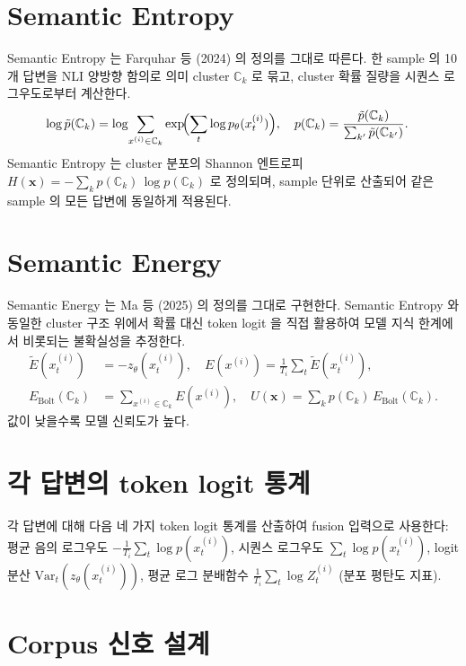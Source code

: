 \section{Semantic Entropy}\label{sec:se_def}

Semantic Entropy 는 Farquhar 등 (2024) 의 정의를 그대로 따른다. 한 sample 의 10개 답변을 NLI 양방향 함의로 의미 cluster $\mathbb{C}_k$ 로 묶고, cluster 확률 질량을 시퀀스 로그우도로부터 계산한다.
\begin{align*}
\log \tilde{p}(\mathbb{C}_k) &= \log\!\sum_{x^{(i)} \in \mathbb{C}_k} \exp\!\Bigl(\sum_t \log p_\theta(x_t^{(i)})\Bigr), \quad p(\mathbb{C}_k) = \frac{\tilde{p}(\mathbb{C}_k)}{\sum_{k'} \tilde{p}(\mathbb{C}_{k'})}.
\end{align*}
Semantic Entropy 는 cluster 분포의 Shannon 엔트로피 $H(\mathbf{x}) = -\sum_{k} p(\mathbb{C}_k)\, \log p(\mathbb{C}_k)$ 로 정의되며, sample 단위로 산출되어 같은 sample 의 모든 답변에 동일하게 적용된다.

\section{Semantic Energy}\label{sec:energy_def}

Semantic Energy 는 Ma 등 (2025) 의 정의를 그대로 구현한다. Semantic Entropy 와 동일한 cluster 구조 위에서 확률 대신 token logit 을 직접 활용하여 모델 지식 한계에서 비롯되는 불확실성을 추정한다.
\begin{align}
\tilde{E}(x_t^{(i)}) &= -z_\theta(x_t^{(i)}), \quad E(x^{(i)}) = \tfrac{1}{T_i}\sum_{t} \tilde{E}(x_t^{(i)}), \\
E_{\text{Bolt}}(\mathbb{C}_k) &= \sum_{x^{(i)} \in \mathbb{C}_k} E(x^{(i)}), \quad U(\mathbf{x}) = \sum_{k} p(\mathbb{C}_k)\, E_{\text{Bolt}}(\mathbb{C}_k).
\end{align}
값이 낮을수록 모델 신뢰도가 높다.

\section{각 답변의 token logit 통계}\label{sec:diag_def}

각 답변에 대해 다음 네 가지 token logit 통계를 산출하여 fusion 입력으로 사용한다: 평균 음의 로그우도 \(-\tfrac{1}{T_i}\sum_t \log p(x_t^{(i)})\), 시퀀스 로그우도 \(\sum_t \log p(x_t^{(i)})\), logit 분산 \(\mathrm{Var}_t(z_\theta(x_t^{(i)}))\), 평균 로그 분배함수 \(\tfrac{1}{T_i}\sum_t \log Z_t^{(i)}\) (분포 평탄도 지표).

\section{Corpus 신호 설계}\label{sec:corpus_def}

